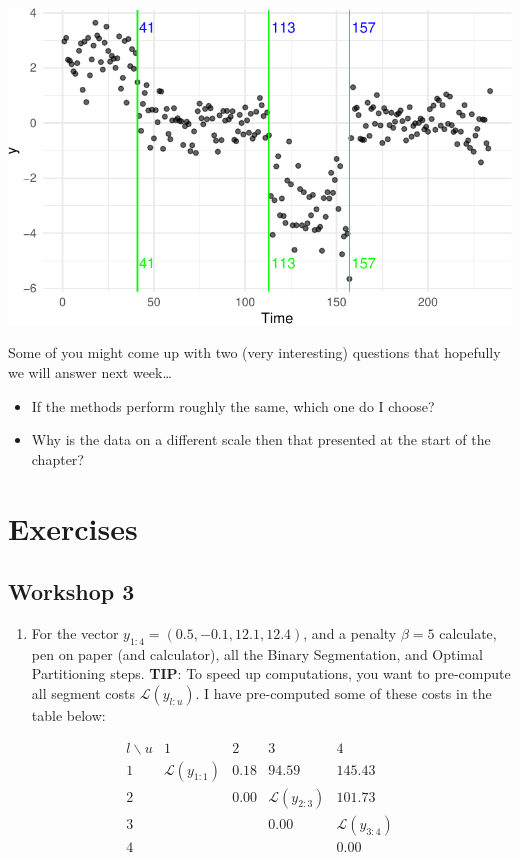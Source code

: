 \documentclass[
  letterpaper,
  DIV=11,
  numbers=noendperiod]{scrreprt}
\providecommand{\tightlist}{%
  \setlength{\itemsep}{0pt}\setlength{\parskip}{0pt}}\usepackage{longtable,booktabs,array}
\begin{document}
\includegraphics{3_multiple_changes_files/figure-pdf/unnamed-chunk-17-1.pdf}

Some of you might come up with two (very interesting) questions that
hopefully we will answer next week\ldots{}

\begin{itemize}
\item
  If the methods perform roughly the same, which one do I choose?
\item
  Why is the data on a different scale then that presented at the start
  of the chapter?
\end{itemize}

\section{Exercises}\label{exercises-2}

\subsection{Workshop 3}\label{workshop-3}

\begin{enumerate}
\def\labelenumi{\arabic{enumi}.}
\tightlist
\item
  For the vector \(y_{1:4} = (0.5, -0.1, 12.1, 12.4)\), and a penalty
  \(\beta = 5\) calculate, pen on paper (and calculator), all the Binary
  Segmentation, and Optimal Partitioning steps. \textbf{TIP}: To speed
  up computations, you want to pre-compute all segment costs
  \(\mathcal{L}(y_{l:u})\). I have pre-computed some of these costs in
  the table below:
\end{enumerate}

\[
\begin{array}{c|cccc}
l \backslash u & 1 & 2 & 3 & 4 \\
\hline
1 & \mathcal{L}(y_{1:1}) & 0.18 & 94.59 & 145.43 \\
2 &  & 0.00 & \mathcal{L}(y_{2:3}) & 101.73 \\
3 &  &  & 0.00 & \mathcal{L}(y_{3:4}) \\
4 &  &  &  & 0.00 \\
\end{array}
\]
\end{document}
